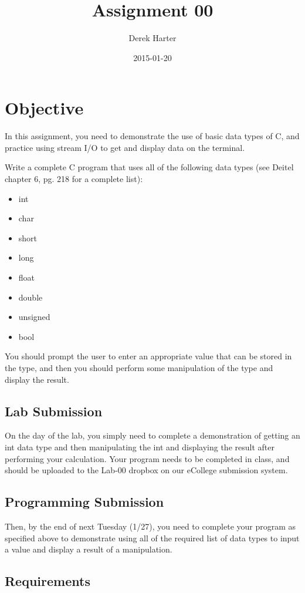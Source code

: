 \documentclass[11pt]{article}
\title{Assignment 00}
\author{Derek Harter}
\date{2015-01-20}
\begin{document}
\maketitle

\section*{Objective}
\label{sec-1}


In this assignment, you need to demonstrate the use of basic data
types of C, and practice using stream I/O to get and display data on
the terminal.

Write a complete C program that uses all of the following data types
(see Deitel chapter 6, pg. 218 for a complete list):

\begin{itemize}
\item int
\item char
\item short
\item long
\item float
\item double
\item unsigned
\item bool
\end{itemize}

You should prompt the user to enter an appropriate value that can be
stored in the type, and then you should perform some manipulation of
the type and display the result.
\subsection*{Lab Submission}
\label{sec-1-1}

On the day of the lab, you simply need to complete a demonstration of
getting an int data type and then manipulating the int and displaying
the result after performing your calculation.  Your program needs to
be completed in class, and should be uploaded to the Lab-00 dropbox on
our eCollege submission system.
\subsection*{Programming Submission}
\label{sec-1-2}

Then, by the end of next Tuesday (1/27), you need to complete your
program as specified above to demonstrate using all of the required
list of data types to input a value and display a result of a
manipulation.
\subsection*{Requirements}
\label{sec-1-3}
\end{document}
